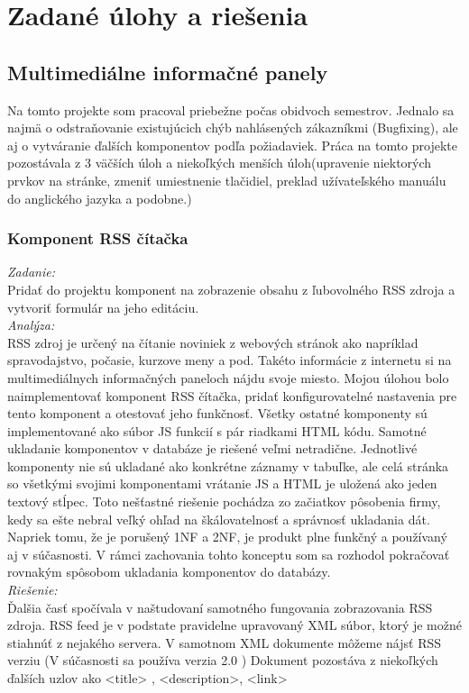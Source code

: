 \documentclass[11pt, oneside]{report}
\begin{document}
\chapter{Zadané úlohy a riešenia}
\section{Multimediálne informačné panely}
Na tomto projekte som pracoval  priebežne počas  obidvoch semestrov. Jednalo sa najmä o  odstraňovanie existujúcich chýb nahlásených zákazníkmi (Bugfixing), ale aj o vytváranie ďalších komponentov podľa požiadaviek. Práca na tomto projekte pozostávala z 3 väčších úloh  a  niekoľkých menších úloh(upravenie niektorých prvkov na stránke, zmeniť umiestnenie tlačidiel, preklad užívateľského manuálu do anglického jazyka a podobne.)
\subsection*{Komponent RSS čítačka}
\textit{Zadanie:}\\
Pridať do projektu  komponent na zobrazenie obsahu z ľubovolného RSS zdroja a vytvoriť formulár na jeho editáciu.
\\\textit{Analýza:}\\
 RSS zdroj   je určený na čítanie noviniek  z webových stránok ako napríklad spravodajstvo, počasie, kurzove meny a pod. Takéto informácie  z internetu si na multimediálnych informačných paneloch nájdu svoje miesto. Mojou úlohou bolo naimplementovať komponent RSS čítačka, pridať  konfigurovatelné nastavenia pre tento komponent a otestovať jeho funkčnosť.
Všetky ostatné komponenty sú implementované ako súbor JS funkcií s pár riadkami HTML kódu. Samotné ukladanie komponentov v databáze je riešené veľmi netradične. Jednotlivé komponenty nie sú ukladané ako konkrétne záznamy v tabuľke, ale celá stránka  so všetkými svojimi komponentami vrátanie JS a HTML je uložená ako jeden textový stĺpec. Toto nešťastné riešenie  pochádza  zo začiatkov pôsobenia firmy, kedy sa ešte nebral veľký ohľad na  škálovatelnosť a  správnosť ukladania dát. 
Napriek tomu, že je porušený 1NF a 2NF, je produkt plne funkčný a používaný aj v súčasnosti. V rámci zachovania tohto konceptu som sa rozhodol pokračovať rovnakým spôsobom ukladania komponentov do databázy.
\\\textit{Riešenie:}\\
Ďalšia časť spočívala v naštudovaní samotného fungovania zobrazovania RSS zdroja. RSS feed je v podstate pravidelne upravovaný XML súbor, ktorý je možné stiahnúť z nejakého servera. V samotnom XML dokumente môžeme nájsť RSS verziu (V súčasnosti sa používa verzia 2.0 ) Dokument pozostáva z niekoľkých ďalších uzlov ako <title> , <description>, <link>
\end{document}

